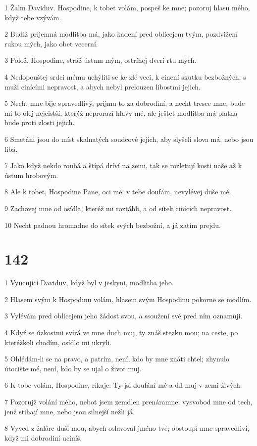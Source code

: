 \par 1 Žalm Daviduv. Hospodine, k tobet volám, pospeš ke mne; pozoruj hlasu mého, když tebe vzývám.
\par 2 Budiž príjemná modlitba má, jako kadení pred oblícejem tvým, pozdvižení rukou mých, jako obet vecerní.
\par 3 Polož, Hospodine, stráž ústum mým, ostríhej dverí rtu mých.
\par 4 Nedopouštej srdci mému uchýliti se ke zlé veci, k cinení skutku bezbožných, s muži cinícími nepravost, a abych nebyl prelouzen líbostmi jejich.
\par 5 Necht mne bije spravedlivý, prijmu to za dobrodiní, a necht tresce mne, bude mi to olej nejcistší, kterýž neprorazí hlavy mé, ale ještet modlitba má platná bude proti zlosti jejich.
\par 6 Smetáni jsou do míst skalnatých soudcové jejich, aby slyšeli slova má, nebo jsou libá.
\par 7 Jako když nekdo roubá a štípá dríví na zemi, tak se rozletují kosti naše až k ústum hrobovým.
\par 8 Ale k tobet, Hospodine Pane, oci mé; v tebe doufám, nevylévej duše mé.
\par 9 Zachovej mne od osídla, kteréž mi roztáhli, a od sítek cinících nepravost.
\par 10 Necht padnou hromadne do sítek svých bezbožní, a já zatím prejdu.

\chapter{142}

\par 1 Vyucující Daviduv, když byl v jeskyni, modlitba jeho.
\par 2 Hlasem svým k Hospodinu volám, hlasem svým Hospodinu pokorne se modlím.
\par 3 Vylévám pred oblícejem jeho žádost svou, a ssoužení své pred ním oznamuji.
\par 4 Když se úzkostmi svírá ve mne duch muj, ty znáš stezku mou; na ceste, po kteréžkoli chodím, osídlo mi ukryli.
\par 5 Ohlédám-li se na pravo, a patrím, není, kdo by mne znáti chtel; zhynulo útocište mé, není, kdo by se ujal o život muj.
\par 6 K tobe volám, Hospodine, ríkaje: Ty jsi doufání mé a díl muj v zemi živých.
\par 7 Pozorujž volání mého, nebot jsem zemdlen prenáramne; vysvobod mne od tech, jenž stihají mne, nebo jsou silnejší nežli já.
\par 8 Vyved z žaláre duši mou, abych oslavoval jméno tvé; obstoupí mne spravedliví, když mi dobrodiní uciníš.


